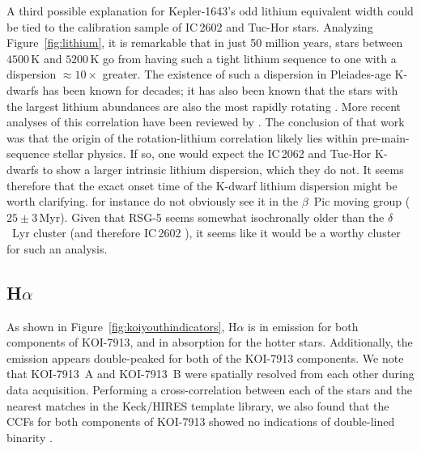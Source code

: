 \documentclass[12pt,twocolumn]{aastex63}
\begin{document}
A third possible explanation for Kepler-1643's odd lithium equivalent
width could be tied to the calibration sample of IC\,2602 and Tuc-Hor
stars.  Analyzing Figure~\ref{fig:lithium}, it is remarkable that in
just 50 million years, stars between $4500$\,K and $5200$\,K go from
having such a tight lithium sequence to one with a dispersion
$\approx10\times$ greater.  The existence of such a dispersion in
Pleiades-age K-dwarfs has been known for decades; it has also been
known that the stars with the largest lithium abundances are also the
most rapidly rotating
\citep{butler_pleiades_1987,soderblom_evolution_1993}.  More recent
analyses of this correlation have been reviewed by
\citet{bouvier_lithium-rotation_2020}.  The conclusion of that work
was that the origin of the rotation-lithium correlation likely lies
within pre-main-sequence stellar physics.  If so, one would expect the
IC\,2062 and Tuc-Hor K-dwarfs to show a larger intrinsic lithium
dispersion, which they do not.  It seems therefore that the exact
onset time of the K-dwarf lithium dispersion might be worth
clarifying.  \citet{messina_rotation-lithium_2016} for instance do not
obviously see it in the $\beta$~Pic moving group ($25\pm3$\,Myr).
Given that RSG-5 seems somewhat isochronally older than the
$\delta$~Lyr cluster (and therefore IC\,2602
\citealt{bouma_kep1627_2022}), it seems like it would be a worthy
cluster for such an analysis.

\subsection{H$\alpha$}

As shown in Figure~\ref{fig:koiyouthindicators}, H$\alpha$ is in
emission for both components of KOI-7913, and in absorption for the
hotter stars.  Additionally, the emission appears double-peaked for
both of the KOI-7913 components.  We note that KOI-7913~A and
KOI-7913~B were spatially resolved from each other during data
acquisition.  Performing a cross-correlation between each of the stars
and the nearest matches in the Keck/HIRES template library, we also
found that the CCFs for both components of KOI-7913 showed no
indications of double-lined binarity \citep{kolbl_detection_2015}.
\end{document}
